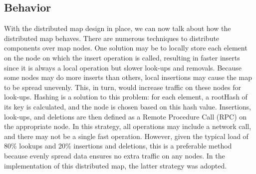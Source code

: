 \documentclass[letterpaper, 10 pt, conference]{ieeeconf}  %
\begin{document}


\subsection{Behavior}
With the distributed map design in place, we can now talk about how the distributed map behaves. There are numerous techniques to distribute components over map nodes. One solution may be to locally store each element on the node on which the insert operation is called, resulting in faster inserts since it is always a local operation but slower look-ups and removals. Because some nodes may do more inserts than others, local insertions may cause the map to be spread unevenly. This, in turn, would increase traffic on these nodes for look-ups. Hashing is a solution to this problem: for each element, a rootHash of its key is calculated, and the node is chosen based on this hash value. Insertions, look-ups, and deletions are then defined as a Remote Procedure Call (RPC) on the appropriate node. In this strategy, all operations may include a network call, and there may not be a single fast operation. However, given the typical load of 80\% lookups and 20\% insertions and deletions, this is a preferable method because evenly spread data ensures no extra traffic on any nodes. In the implementation of this distributed map, the latter strategy was adopted.
\end{document}
